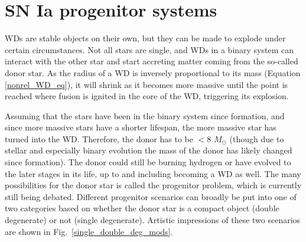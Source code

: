 \documentclass[a4paper,oneside,12pt, class=Latex/Classes/PhDthesisPSnPDF, crop=false]{standalone}
\begin{document}
\section{SN Ia progenitor systems}
\label{Ia_progenitors}
WDs are stable objects on their own, but they can be made to explode under certain circumstances. Not all stars are single, and WDs in a binary system can interact with the other star and start accreting matter coming from the so-called donor star. As the radius of a WD is inversely proportional to its mass (Equation \ref{nonrel_WD_eq}), it will shrink as it becomes more massive until the point is reached where fusion is ignited in the core of the WD, triggering its explosion.

Assuming that the stars have been in the binary system since formation, and since more massive stars have a shorter lifespan, the more massive star has turned into the WD. Therefore, the donor has to be $<8$ $M_\odot$ (though due to stellar and especially binary evolution the mass of the donor has likely changed since formation). The donor could still be burning hydrogen or have evolved to the later stages in its life, up to and including becoming a WD as well. The many possibilities for the donor star is called the progenitor problem, which is currently still being debated. Different progenitor scenarios can broadly be put into one of two categories based on whether the donor star is a compact object (double degenerate) or not (single degenerate). Artistic impressions of these two scenarios are shown in Fig.~\ref{single_double_deg_mods}.
\end{document}
